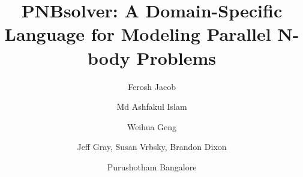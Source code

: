 \documentclass[draftclsnofoot]{elsarticle}
\begin{document}
\begin{frontmatter}
%
\title{PNBsolver: A Domain-Specific Language for Modeling Parallel N-body Problems
}




\author{Ferosh Jacob}
\address{Data Science R\&D, Careerbuilder LLC}

\author{Md Ashfakul Islam}
\address{Department of Computer Science, University of Alabama}

\author{Weihua Geng}
\address{Department of Mathematics, Southern Methodist University}

\author{Jeff Gray, Susan Vrbsky, Brandon Dixon}
\address{Department of Computer Science, University of Alabama}

\author{Purushotham Bangalore}
\address{Computer and Information Sciences,University of Alabama at Birmingham}
%

% 





\end{frontmatter}
\end{document}
